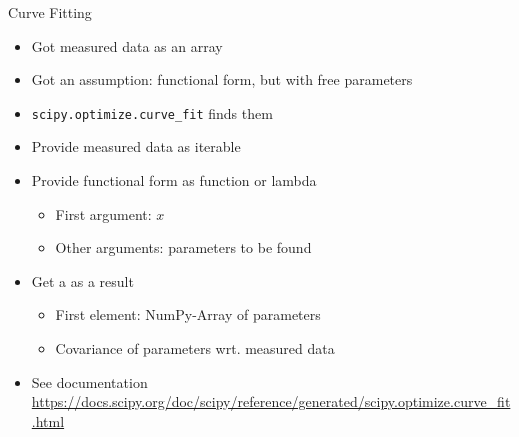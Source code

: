 
\begin{frame}[fragile]{Curve Fitting}
%
\begin{itemize}
\item Got measured data as an array
\item Got an assumption: functional form, but with free parameters
\item[\Thus] \texttt{scipy.optimize.curve\_fit} finds them
\item Provide measured data as iterable
\item Provide functional form as function or lambda
	\begin{itemize}
	\item First argument: $x$
	\item Other arguments: parameters to be found
	\end{itemize}
\item Get a  as a result
	\begin{itemize}
	\item First element: NumPy-Array of parameters
	\item Covariance of parameters wrt. measured data
	\end{itemize}
\item See documentation\\
	{\scriptsize \url{https://docs.scipy.org/doc/scipy/reference/generated/scipy.optimize.curve_fit.html}}
\end{itemize}
%
\end{frame}


